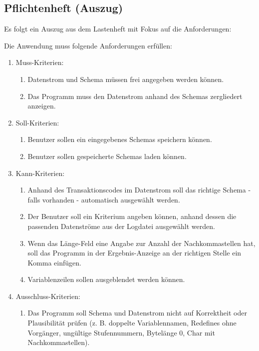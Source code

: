 \subsection{Pflichtenheft (Auszug)}
\label{app:Pflichtenheft}
Es folgt ein Auszug aus dem Lastenheft mit Fokus auf die Anforderungen:

Die Anwendung muss folgende Anforderungen erfüllen: 
\begin{enumerate}[itemsep=0em,partopsep=0em,parsep=0em,topsep=0em]
\item Muss-Kriterien:
	\begin{enumerate}
	\item Datenstrom und Schema müssen frei angegeben werden können.
	\item Das Programm muss den Datenstrom anhand des Schemas zergliedert anzeigen.
	\end{enumerate}
\item Soll-Kriterien:
	\begin{enumerate}
	\item Benutzer sollen ein eingegebenes Schemas speichern können.
	\item Benutzer sollen gespeicherte Schemas laden können.
	\end{enumerate}
\item Kann-Kriterien:
	\begin{enumerate}
    \item Anhand des Transaktionscodes im Datenstrom soll das richtige Schema - falls vorhanden - automatisch ausgewählt werden.
    \item Der Benutzer soll ein Kriterium angeben können, anhand dessen die passenden Datenströme aus der Logdatei ausgewählt werden.
    \item Wenn das Länge-Feld eine Angabe zur Anzahl der Nachkommastellen hat, soll das Programm in der Ergebnis-Anzeige an der richtigen Stelle ein Komma einfügen.

    \item Variablenzeilen sollen ausgeblendet werden können.
        \end{enumerate}
\item Ausschluss-Kriterien:
	\begin{enumerate}
    \item Das Programm soll Schema und Datenstrom nicht auf Korrektheit oder Plausibilität prüfen
(z. B. doppelte Variablennamen, Redefines ohne Vorgänger, ungültige Stufennummern, Bytelänge 0, Char mit Nachkommastellen).
    \end{enumerate}
\end{enumerate}
